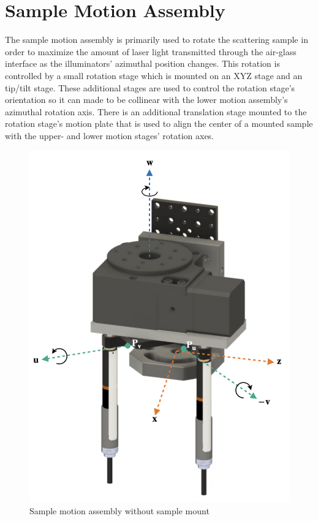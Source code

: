\section{Sample Motion Assembly}
The sample motion assembly is primarily used to rotate the scattering sample in order to maximize the amount of laser light transmitted through the air-glass interface as the illuminators' azimuthal position changes. This rotation is controlled by a small rotation stage which is mounted on an XYZ stage and an tip/tilt stage. These additional stages are used to control the rotation stage's orientation so it can made to be collinear with the lower motion assembly's azimuthal rotation axis. There is an additional translation stage mounted to the rotation stage's motion plate that is used to align the center of a mounted sample with the upper- and lower motion stages' rotation axes.
\begin{figure}
    \centering
    \includegraphics[width=0.5\linewidth]{figures/assy_upper.png}
    \caption{Sample motion assembly without sample mount}
    \label{fig:sample_motion_assy}
\end{figure}

